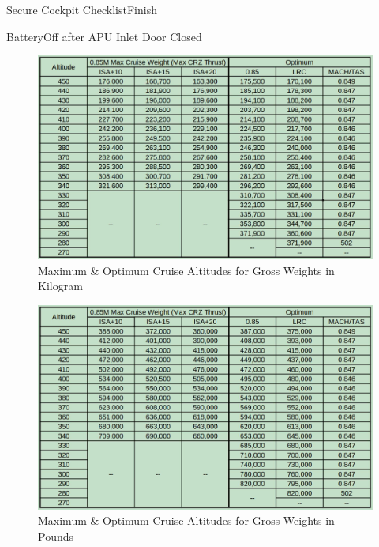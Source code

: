 \documentclass[sim-use]{checklist}
\begin{document}
\begin{continuedchecklist}
	\item{Secure Cockpit Checklist}{Finish}
	\item{Battery}{Off after APU Inlet Door Closed}
\end{continuedchecklist}

\begin{figure}[h]
    \centering
	\includegraphics[width=\linewidth]{addenda/maxaltitude_kg_felis.png}
    \caption{Maximum \& Optimum Cruise Altitudes for Gross Weights in Kilogram}
\end{figure}

\begin{figure}[h]
    \centering
	\includegraphics[width=\linewidth]{addenda/maxaltitude_lb_felis.png}
    \caption{Maximum \& Optimum Cruise Altitudes for Gross Weights in Pounds}
\end{figure}
\end{document}
